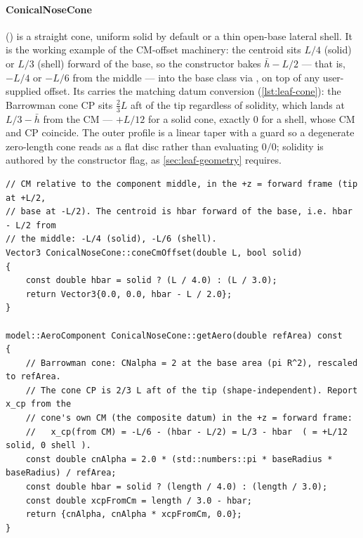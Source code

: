 \paragraph{ConicalNoseCone} () is a straight cone, uniform
solid by default or a thin open-base lateral shell. It is the working example of the CM-offset
machinery: the centroid sits $L/4$ (solid) or $L/3$ (shell) forward of the base, so the
constructor bakes $\bar h - L/2$ --- that is, $-L/4$ or $-L/6$ from the middle --- into the base
class via , on top of any user-supplied offset. Its  carries the
matching datum conversion (\cref{lst:leaf-cone}): the Barrowman cone CP sits $\tfrac{2}{3}L$ aft
of the tip regardless of solidity, which lands at $L/3 - \bar h$ from the CM --- $+L/12$ for a
solid cone, exactly 0 for a shell, whose CM and CP coincide. The outer profile is a linear taper
with a guard so a degenerate zero-length cone reads as a flat disc rather than evaluating $0/0$;
solidity is authored by the constructor flag, as \cref{sec:leaf-geometry} requires.

\begin{listing}[htbp]
\begin{verbatim}
// CM relative to the component middle, in the +z = forward frame (tip at +L/2,
// base at -L/2). The centroid is hbar forward of the base, i.e. hbar - L/2 from
// the middle: -L/4 (solid), -L/6 (shell).
Vector3 ConicalNoseCone::coneCmOffset(double L, bool solid)
{
    const double hbar = solid ? (L / 4.0) : (L / 3.0);
    return Vector3{0.0, 0.0, hbar - L / 2.0};
}

model::AeroComponent ConicalNoseCone::getAero(double refArea) const
{
    // Barrowman cone: CNalpha = 2 at the base area (pi R^2), rescaled to refArea.
    // The cone CP is 2/3 L aft of the tip (shape-independent). Report x_cp from the
    // cone's own CM (the composite datum) in the +z = forward frame:
    //   x_cp(from CM) = -L/6 - (hbar - L/2) = L/3 - hbar  ( = +L/12 solid, 0 shell ).
    const double cnAlpha = 2.0 * (std::numbers::pi * baseRadius * baseRadius) / refArea;
    const double hbar = solid ? (length / 4.0) : (length / 3.0);
    const double xcpFromCm = length / 3.0 - hbar;
    return {cnAlpha, cnAlpha * xcpFromCm, 0.0};
}
\end{verbatim}
\caption{The cone's centroid offset and its own-CM aero datum conversion
(--68, lightly elided).}\label{lst:leaf-cone}
\end{listing}

